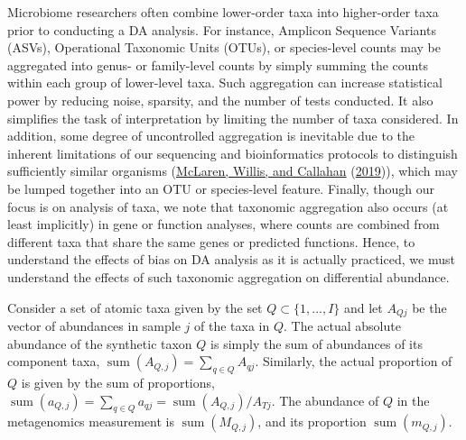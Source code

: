 \documentclass[
]{article}
\theoremstyle{definition}
\theoremstyle{definition}
\theoremstyle{definition}
\theoremstyle{definition}
\theoremstyle{remark}
\begin{document}
Microbiome researchers often combine lower-order taxa into higher-order taxa prior to conducting a DA analysis.
For instance, Amplicon Sequence Variants (ASVs), Operational Taxonomic Units (OTUs), or species-level counts may be aggregated into genus- or family-level counts by simply summing the counts within each group of lower-level taxa.
Such aggregation can increase statistical power by reducing noise, sparsity, and the number of tests conducted.
It also simplifies the task of interpretation by limiting the number of taxa considered.
In addition, some degree of uncontrolled aggregation is inevitable due to the inherent limitations of our sequencing and bioinformatics protocols to distinguish sufficiently similar organisms (\protect\hyperlink{ref-mclaren2019cons}{McLaren, Willis, and Callahan} (\protect\hyperlink{ref-mclaren2019cons}{2019})), which may be lumped together into an OTU or species-level feature.
Finally, though our focus is on analysis of taxa, we note that taxonomic aggregation also occurs (at least implicitly) in gene or function analyses, where counts are combined from different taxa that share the same genes or predicted functions.
Hence, to understand the effects of bias on DA analysis as it is actually practiced, we must understand the effects of such taxonomic aggregation on differential abundance.

Consider a set of atomic taxa given by the set \(Q \subset \{1, \dots, I\}\) and let \(A_{Qj}\) be the vector of abundances in sample \(j\) of the taxa in \(Q\).
The actual absolute abundance of the synthetic taxon \(Q\) is simply the sum of abundances of its component taxa, \(\operatorname{sum}\left(A_{Q,j}\right) = \sum_{q \in Q} A_{qj}\).
Similarly, the actual proportion of \(Q\) is given by the sum of proportions, \(\operatorname{sum}\left(a_{Q,j}\right) = \sum_{q \in Q} a_{qj} = \operatorname{sum}\left(A_{Q,j}\right) / A_{Tj}\).
The abundance of \(Q\) in the metagenomics measurement is \(\operatorname{sum}\left(M_{Q,j}\right)\), and its proportion \(\operatorname{sum}\left(m_{Q,j}\right)\).
\end{document}
